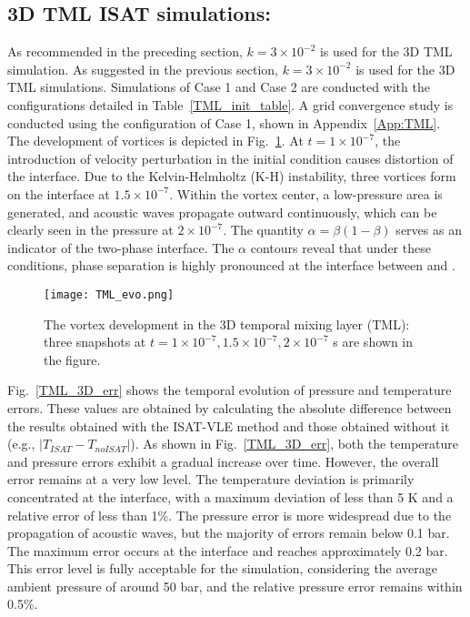 \subsection{3D TML ISAT simulations:}

As recommended in the preceding section, $k = 3\times 10^{-2}$ is used for the 3D TML simulation.
As suggested in the previous section, $k = 3\times 10^{-2}$ is used for the 3D TML simulations. Simulations of Case 1 and Case 2 are conducted with the configurations detailed in Table~\ref{TML_init_table}. A grid convergence study is conducted using the configuration of Case 1, shown in Appendix~\ref{App:TML}. The development of vortices is depicted in Fig.~\ref{TML_3D_evo}. At $t = 1\times 10^{-7}$, the introduction of velocity perturbation in the initial condition causes distortion of the interface. Due to the Kelvin-Helmholtz (K-H) instability, three vortices form on the interface at $1.5 \times 10^{-7}$. Within the vortex center, a low-pressure area is generated, and acoustic waves propagate outward continuously, which can be clearly seen in the pressure at $2\times 10^{-7}$. The quantity $\alpha=\beta(1-\beta)$ serves as an indicator of the two-phase interface. The $\alpha$ contours reveal that under these conditions, phase separation is highly pronounced at the interface between  and .%

\begin{figure}[htbp]
\centering
\texttt{[image: TML\_evo.png]}
\caption{The vortex development in the 3D temporal mixing layer (TML): three snapshots at $t = 1\times 10^{-7}, 1.5 \times 10^{-7}, 2\times 10^{-7}$ s are shown in the figure.}
\label{TML_3D_evo} 
\end{figure}

Fig.~\ref{TML_3D_err} shows the temporal evolution of pressure and temperature errors. These values are obtained by calculating the absolute difference between the results obtained with the ISAT-VLE method and those obtained without it (e.g., $|T_{ISAT}-T_{noISAT}|$). As shown in Fig.~\ref{TML_3D_err}, both the temperature and pressure errors exhibit a gradual increase over time. However, the overall error remains at a very low level. The temperature deviation is primarily concentrated at the interface, with a maximum deviation of less than 5 K and a relative error of less than 1\%. The pressure error is more widespread due to the propagation of acoustic waves, but the majority of errors remain below 0.1 bar. The maximum error occurs at the interface and reaches approximately 0.2 bar. This error level is fully acceptable for the simulation, considering the average ambient pressure of around 50 bar, and the relative pressure error remains within 0.5\%.



